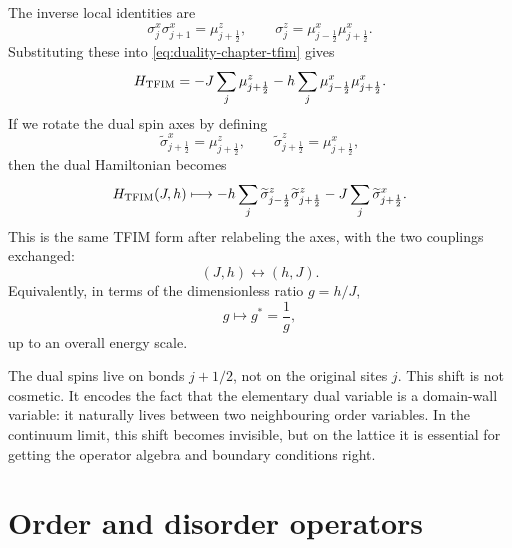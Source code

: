 The inverse local identities are
\begin{equation}
\label{eq:duality-inverse-local-identities}
    \sigma_j^x\sigma_{j+1}^x=\mu_{j+\frac12}^z,
    \qquad
    \sigma_j^z=\mu_{j-\frac12}^x\mu_{j+\frac12}^x .
\end{equation}
Substituting these into \cref{eq:duality-chapter-tfim} gives
\begin{equation}
\label{eq:duality-tfim-dual-hamiltonian-mu}
    H_{\rm TFIM}
    =
    -J\sum_j\mu_{j+\frac12}^z
    -h\sum_j\mu_{j-\frac12}^x\mu_{j+\frac12}^x .
\end{equation}
If we rotate the dual spin axes by defining
\begin{equation}
\label{eq:duality-rotated-dual-spins}
    \widetilde{\sigma}_{j+\frac12}^x=\mu_{j+\frac12}^z,
    \qquad
    \widetilde{\sigma}_{j+\frac12}^z=\mu_{j+\frac12}^x,
\end{equation}
then the dual Hamiltonian becomes
\begin{equation}
\label{eq:duality-tfim-dual-hamiltonian-tilde}
    H_{\rm TFIM}(J,h)
    \longmapsto
    -h\sum_j
    \widetilde{\sigma}_{j-\frac12}^z
    \widetilde{\sigma}_{j+\frac12}^z
    -J\sum_j
    \widetilde{\sigma}_{j+\frac12}^x .
\end{equation}
This is the same TFIM form after relabeling the axes, with the two couplings
exchanged:
\begin{equation}
\label{eq:duality-tfim-coupling-exchange}
    (J,h)\longleftrightarrow (h,J).
\end{equation}
Equivalently, in terms of the dimensionless ratio $g=h/J$,
\begin{equation}
\label{eq:duality-g-to-inverse-g}
    g\longmapsto g^*=\frac1g,
\end{equation}
up to an overall energy scale.

\begin{remark}
The dual spins live on bonds $j+1/2$, not on the original sites $j$.  This shift
is not cosmetic.  It encodes the fact that the elementary dual variable is a
domain-wall variable: it naturally lives between two neighbouring order
variables.  In the continuum limit, this shift becomes invisible, but on the
lattice it is essential for getting the operator algebra and boundary conditions
right.
\end{remark}

\section{Order and disorder operators}
\label{sec:order-disorder-operators}

